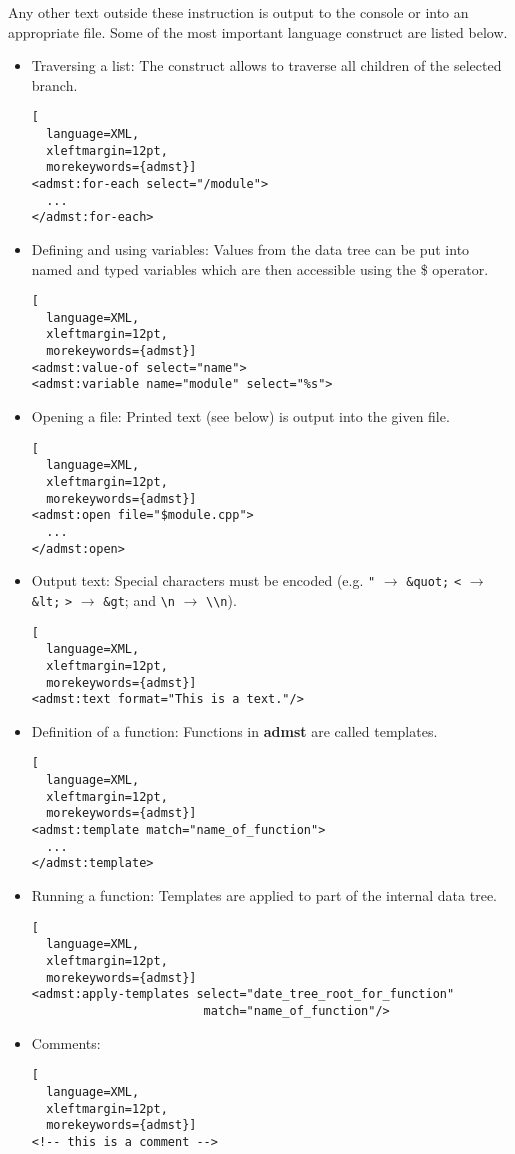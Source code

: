 Any other text outside these instruction is output to the console or
into an appropriate file.  Some of the most important language
construct are listed below.

\begin{itemize}

\item
Traversing a list: The construct allows to traverse all children of
the selected branch.
\begin{lstlisting}[
  language=XML,
  xleftmargin=12pt,
  morekeywords={admst}]
<admst:for-each select="/module">
  ...
</admst:for-each>
\end{lstlisting}

\item
Defining and using variables: Values from the data tree can be put
into named and typed variables which are then accessible using the \$
operator.
\begin{lstlisting}[
  language=XML,
  xleftmargin=12pt,
  morekeywords={admst}]
<admst:value-of select="name">
<admst:variable name="module" select="%s">
\end{lstlisting}

\item
Opening a file: Printed text (see below) is output into the given
file.
\begin{lstlisting}[
  language=XML,
  xleftmargin=12pt,
  morekeywords={admst}]
<admst:open file="$module.cpp">
  ...
</admst:open>
\end{lstlisting}

\item
Output text: Special characters must be encoded (e.g. \verb+"+ $\rightarrow$
\verb+&quot;+ \verb+<+ $\rightarrow$ \verb+&lt;+ \verb+>+
$\rightarrow$ \verb+&gt+; and \verb+\n+ $\rightarrow$ \verb+\\n+).
\begin{lstlisting}[
  language=XML,
  xleftmargin=12pt,
  morekeywords={admst}]
<admst:text format="This is a text."/>
\end{lstlisting}

\item
Definition of a function:  Functions in \textbf{admst} are called templates.
\begin{lstlisting}[
  language=XML,
  xleftmargin=12pt,
  morekeywords={admst}]
<admst:template match="name_of_function">
  ...
</admst:template>
\end{lstlisting}

\item
Running a function: Templates are applied to part of the internal data
tree.
\begin{lstlisting}[
  language=XML,
  xleftmargin=12pt,
  morekeywords={admst}]
<admst:apply-templates select="date_tree_root_for_function"
                        match="name_of_function"/>
\end{lstlisting}

\item Comments:
\begin{lstlisting}[
  language=XML,
  xleftmargin=12pt,
  morekeywords={admst}]
<!-- this is a comment -->
\end{lstlisting}

\end{itemize}

